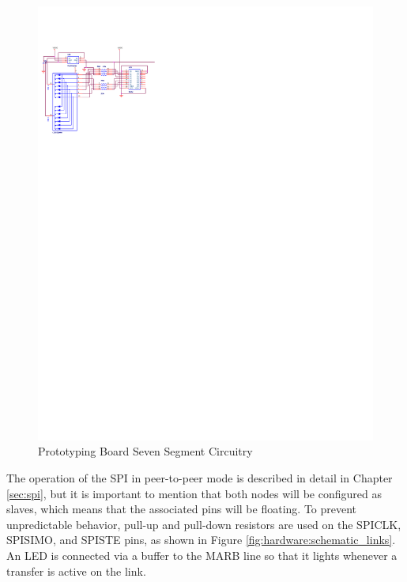 \begin{figure}[ptb]
	\begin{centering}
		\includegraphics[scale=1.3]{Hardware/Figures/hardware-schematic_seven_segment.pdf}
		\caption{Prototyping Board Seven Segment Circuitry}
		\label{fig:hardware:schematic_seven_segment}
	\end{centering}
\end{figure}

The operation of the SPI in peer-to-peer mode is described in detail in Chapter \ref{sec:spi}, but it is important to mention that both nodes will be configured as slaves, which means that the associated pins will be floating. To prevent unpredictable behavior, pull-up and pull-down resistors are used on the SPICLK, SPISIMO, and SPISTE pins, as shown in Figure \ref{fig:hardware:schematic_links}. An LED is connected via a buffer to the MARB line so that it lights whenever a transfer is active on the link.

